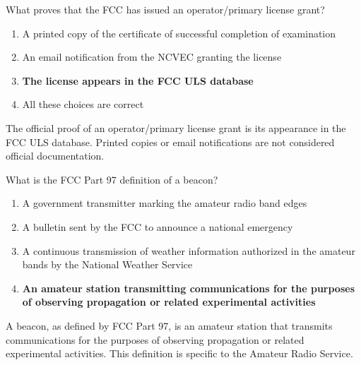 
\begin{tcolorbox}[colback=gray!10!white,colframe=black!75!black,title={T1A05}]
    What proves that the FCC has issued an operator/primary license grant?
    \begin{enumerate}[label=\Alph*),noitemsep]
        \item A printed copy of the certificate of successful completion of examination
        \item An email notification from the NCVEC granting the license
        \item \textbf{The license appears in the FCC ULS database}
        \item All these choices are correct
    \end{enumerate}
\end{tcolorbox}
The official proof of an operator/primary license grant is its appearance in the FCC ULS database. Printed copies or email notifications are not considered official documentation.


\begin{tcolorbox}[colback=gray!10!white,colframe=black!75!black,title={T1A06}]
    What is the FCC Part 97 definition of a beacon?
    \begin{enumerate}[label=\Alph*),noitemsep]
        \item A government transmitter marking the amateur radio band edges
        \item A bulletin sent by the FCC to announce a national emergency
        \item A continuous transmission of weather information authorized in the amateur bands by the National Weather Service
        \item \textbf{An amateur station transmitting communications for the purposes of observing propagation or related experimental activities}
    \end{enumerate}
\end{tcolorbox}
A beacon, as defined by FCC Part 97, is an amateur station that transmits communications for the purposes of observing propagation or related experimental activities. This definition is specific to the Amateur Radio Service.


